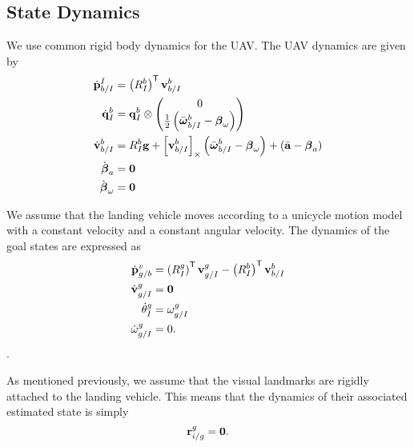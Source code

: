 
\subsection{State Dynamics}
We use common rigid body dynamics for the UAV.
The UAV dynamics are given by
\begin{align}
  \dot{\boldsymbol{\mathrm{p}}}_{b/I}^I
  &=
  \left( R_I^b \right)^{\mathsf{T}} \boldsymbol{\mathrm{v}}_{b/I}^b 
  \\
  \dot{\boldsymbol{\mathrm{q}}}_{I}^{b} 
	&= 	
  \boldsymbol{\mathrm{q}}_I^b \otimes \begin{pmatrix} 0 \\ \frac{1}{2}
  \left( \bar{\boldsymbol{\mathrm{\omega}}}_{b/I}^b - \boldsymbol{\mathrm{\beta}}_\omega \right) \end{pmatrix} \\
  \dot{\boldsymbol{\mathrm{v}}}_{b/I}^b 
  &=
  R_I^b \boldsymbol{\mathrm{g}}
  +
  \left[ \boldsymbol{\mathrm{v}}_{b/I}^b \right]_{\times}
  \left( \bar{\boldsymbol{\mathrm{\omega}}}_{b/I}^b - \boldsymbol{\mathrm{\beta}}_\omega \right)
  +
  \left( \bar{\boldsymbol{\mathrm{a}}} - \boldsymbol{\mathrm{\beta}}_a \right)
  \\
  \dot{\boldsymbol{\mathrm{\beta}}}_a &= \boldsymbol{\mathrm{0}}
  \\
  \dot{\boldsymbol{\mathrm{\beta}}}_\omega &= \boldsymbol{\mathrm{0}}
\end{align}

We assume that the landing vehicle moves according to a unicycle motion model
with a constant velocity and a constant
angular velocity. The dynamics of the goal states are expressed as
\begin{align}
  \dot{\boldsymbol{\mathrm{p}}}_{g/b}^{v} &= \left(R_{I}^{g}\right)^{\mathsf{T}}
  \boldsymbol{\mathrm{v}}_{g/I}^{g} - \left(R_{I}^{b}\right)^{\mathsf{T}} \boldsymbol{\mathrm{v}}_{b/I}^{b} \\
  \dot{\boldsymbol{\mathrm{v}}}_{g/I}^{g} &= \boldsymbol{\mathrm{0}} \\
  \dot{\theta}_{I}^{g} &= \omega_{g/I}^g \\
  \dot{\omega}_{g/I}^{g} &= 0.
\end{align}.

As mentioned previously, we assume that the visual landmarks are rigidly
attached to the landing vehicle. This means that the dynamics of their
associated estimated state is simply
\begin{equation}
  \boldsymbol{\mathrm{r}}_{i/g}^g = \boldsymbol{\mathrm{0}}.
\end{equation}

